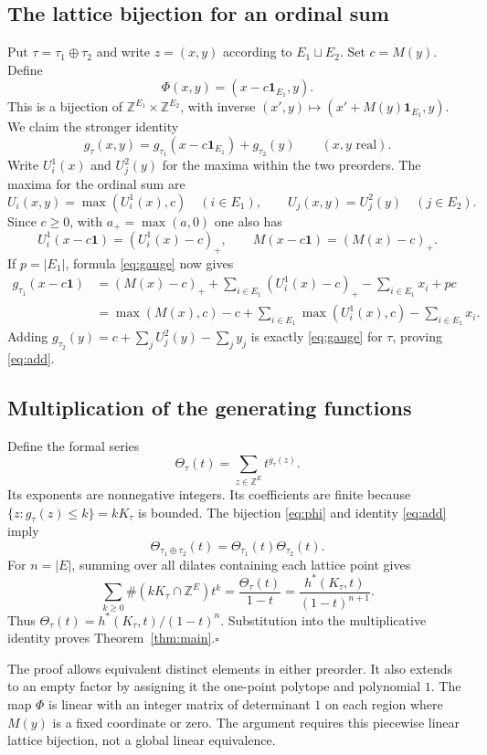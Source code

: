 \documentclass[11pt]{article}
\newcommand{\Z}{\mathbb Z}
\newcommand{\one}{\mathbf1}
\begin{document}
\subsection*{The lattice bijection for an ordinal sum}
Put $\tau=\tau_1\oplus\tau_2$ and write $z=(x,y)$ according
to $E_1\sqcup E_2$. Set $c=M(y)$. Define
\begin{equation}\label{eq:phi}
 \Phi(x,y)=(x-c\one_{E_1},y).
\end{equation}
This is a bijection of $\Z^{E_1}\times\Z^{E_2}$, with inverse
$(x',y)\mapsto(x'+M(y)\one_{E_1},y)$.
We claim the stronger identity
\begin{equation}\label{eq:add}
 g_\tau(x,y)=g_{\tau_1}(x-c\one_{E_1})+g_{\tau_2}(y)
 \qquad(x,y\text{ real}).
\end{equation}
Write $U_i^1(x)$ and $U_j^2(y)$ for the maxima within the two
preorders. The maxima for the ordinal sum are
\[
 U_i(x,y)=\max(U_i^1(x),c)\quad(i\in E_1),\qquad
 U_j(x,y)=U_j^2(y)\quad(j\in E_2).
\]
Since $c\ge0$, with $a_+=\max(a,0)$ one also has
\[
 U_i^1(x-c\one)=(U_i^1(x)-c)_+,
 \qquad M(x-c\one)=(M(x)-c)_+.
\]
If $p=|E_1|$, formula \eqref{eq:gauge} now gives
\begin{align*}
 g_{\tau_1}(x-c\one)
 &= (M(x)-c)_++\sum_{i\in E_1}(U_i^1(x)-c)_+
                  -\sum_{i\in E_1}x_i+pc\\
 &=\max(M(x),c)-c+\sum_{i\in E_1}\max(U_i^1(x),c)
                  -\sum_{i\in E_1}x_i.
\end{align*}
Adding $g_{\tau_2}(y)=c+\sum_j U_j^2(y)-\sum_j y_j$
is exactly \eqref{eq:gauge} for $\tau$, proving \eqref{eq:add}.

\subsection*{Multiplication of the generating functions}
Define the formal series
\[
 \Theta_\tau(t)=\sum_{z\in\Z^E}t^{g_\tau(z)}.
\]
Its exponents are nonnegative integers. Its coefficients are finite
because $\{z:g_\tau(z)\le k\}=kK_\tau$ is bounded.
The bijection \eqref{eq:phi} and identity \eqref{eq:add} imply
\[
 \Theta_{\tau_1\oplus\tau_2}(t)
 =\Theta_{\tau_1}(t)\Theta_{\tau_2}(t).
\]
For $n=|E|$, summing over all dilates containing each lattice point
gives
\[
 \sum_{k\ge0}\#(kK_\tau\cap\Z^E)t^k
 =\frac{\Theta_\tau(t)}{1-t}
 =\frac{h^*(K_\tau,t)}{(1-t)^{n+1}}.
\]
Thus $\Theta_\tau(t)=h^*(K_\tau,t)/(1-t)^n$.
Substitution into the multiplicative identity proves
Theorem~\ref{thm:main}.\hfill$\square$

The proof allows equivalent distinct elements in either preorder.
It also extends to an empty factor by assigning it the one-point
polytope and polynomial $1$. The map $\Phi$ is linear with an
integer matrix of determinant $1$ on each region where $M(y)$
is a fixed coordinate or zero. The argument requires this
piecewise linear lattice bijection, not a global linear equivalence.
\end{document}
